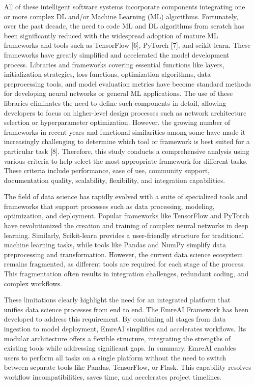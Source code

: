 \documentclass[conference]{IEEEtran}
\begin{document}
All of these intelligent software systems incorporate components integrating one or more complex DL and/or Machine Learning (ML) algorithms. Fortunately, over the past decade, the need to code ML and DL algorithms from scratch has been significantly reduced with the widespread adoption of mature ML frameworks and tools such as TensorFlow [6], PyTorch [7], and scikit-learn. These frameworks have greatly simplified and accelerated the model development process. Libraries and frameworks covering essential functions like layers, initialization strategies, loss functions, optimization algorithms, data preprocessing tools, and model evaluation metrics have become standard methods for developing neural networks or general ML applications. The use of these libraries eliminates the need to define such components in detail, allowing developers to focus on higher-level design processes such as network architecture selection or hyperparameter optimization. However, the growing number of frameworks in recent years and functional similarities among some have made it increasingly challenging to determine which tool or framework is best suited for a particular task [8]. Therefore, this study conducts a comprehensive analysis using various criteria to help select the most appropriate framework for different tasks. These criteria include performance, ease of use, community support, documentation quality, scalability, flexibility, and integration capabilities.

The field of data science has rapidly evolved with a suite of specialized tools and frameworks that support processes such as data processing, modeling, optimization, and deployment. Popular frameworks like TensorFlow and PyTorch have revolutionized the creation and training of complex neural networks in deep learning. Similarly, Scikit-learn provides a user-friendly structure for traditional machine learning tasks, while tools like Pandas and NumPy simplify data preprocessing and transformation. However, the current data science ecosystem remains fragmented, as different tools are required for each stage of the process. This fragmentation often results in integration challenges, redundant coding, and complex workflows.

These limitations clearly highlight the need for an integrated platform that unifies data science processes from end to end. The EmreAI Framework has been developed to address this requirement. By combining all stages from data ingestion to model deployment, EmreAI simplifies and accelerates workflows. Its modular architecture offers a flexible structure, integrating the strengths of existing tools while addressing significant gaps. In summary, EmreAI enables users to perform all tasks on a single platform without the need to switch between separate tools like Pandas, TensorFlow, or Flask. This capability resolves workflow incompatibilities, saves time, and accelerates project timelines.
\end{document}
